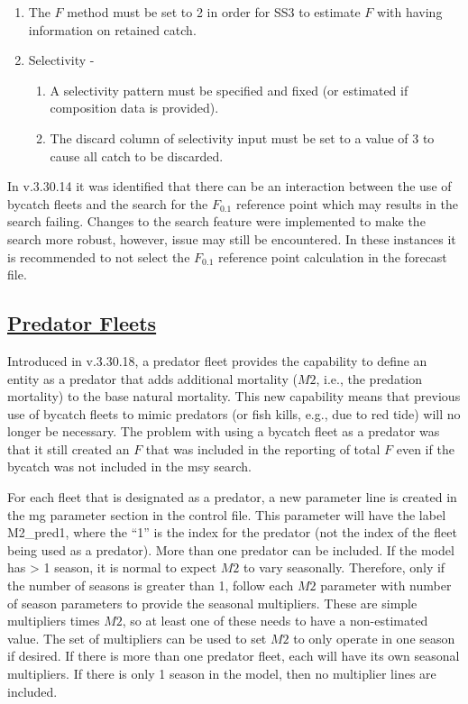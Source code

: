 \begin{enumerate}
	\item The $F$ method must be set to 2 in order for SS3 to estimate $F$ with having information on retained catch.
	\item Selectivity - 
	\begin{enumerate}
		\item A selectivity pattern must be specified and fixed (or estimated if composition data is provided).
		\item The discard column of selectivity input must be set to a value of 3 to cause all catch to be discarded.
	\end{enumerate}	
\end{enumerate}

In v.3.30.14 it was identified that there can be an interaction between the use of bycatch fleets and the search for the $F_{0.1}$ reference point which may results in the search failing.  Changes to the search feature were implemented to make the search more robust, however, issue may still be encountered. In these instances it is recommended to not select the $F_{0.1}$ reference point calculation in the forecast file.

\hypertarget{PredatorFleets}{}
\subsection[Predator Fleets]{\protect\hyperlink{PredatorFleets}{Predator Fleets}}

Introduced in v.3.30.18, a predator fleet provides the capability to define an entity as a predator that adds additional mortality ($M2$, i.e., the predation mortality) to the base natural mortality. This new capability means that previous use of bycatch fleets to mimic predators (or fish kills, e.g., due to red tide) will no longer be necessary. The problem with using a bycatch fleet as a predator was that it still created an $F$ that was included in the reporting of total $F$ even if the bycatch was not included in the \gls{msy} search.

For each fleet that is designated as a predator, a new parameter line is created in the \gls{mg} parameter section in the control file. This parameter will have the label M2\_pred1, where the ``1'' is the index for the predator (not the index of the fleet being used as a predator). More than one predator can be included. If the model has > 1 season, it is normal to expect $M2$ to vary seasonally. Therefore, only if the number of seasons is greater than 1, follow each $M2$ parameter with number of season parameters to provide the seasonal multipliers. These are simple multipliers times $M2$, so at least one of these needs to have a non-estimated value. The set of multipliers can be used to set $M2$ to only operate in one season if desired. If there is more than one predator fleet, each will have its own seasonal multipliers. If there is only 1 season in the model, then no multiplier lines are included.

